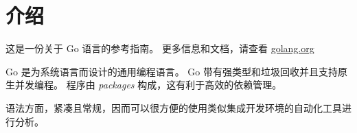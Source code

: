 
\chapter{介绍}
这是一份关于 Go 语言的参考指南。
更多信息和文档，请查看 \href{www.golang.org}{golang.org}

Go 是为系统语言而设计的通用编程语言。
Go 带有强类型和垃圾回收并且支持原生并发编程。
程序由 \emph{packages} 构成，这有利于高效的依赖管理。

语法方面，紧凑且常规，因而可以很方便的使用类似集成开发环境的自动化工具进行分析。